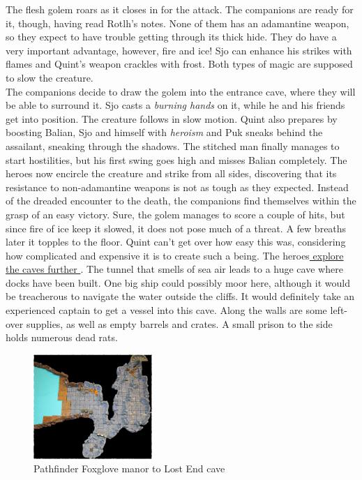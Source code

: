 The flesh golem roars as it closes in for the attack. The companions are ready for it, though, having read Rotlh's notes. None of them has an adamantine weapon, so they expect to have trouble getting through its thick hide. They do have a very important advantage, however, fire and ice! Sjo can enhance his strikes with flames and Quint's weapon crackles with frost. Both types of magic are supposed to slow the creature.\\

The companions decide to draw the golem into the entrance cave, where they will be able to surround it. Sjo casts a {\itshape burning hands} on it, while he and his friends get into position. The creature follows in slow motion. Quint also prepares by boosting Balian, Sjo and himself with  {\itshape heroism} and Puk sneaks behind the assailant, sneaking through the shadows. The stitched man finally manages to start hostilities, but his first swing goes high and misses Balian completely. The heroes now encircle the creature and strike from all sides, discovering that its resistance to non-adamantine weapons is not as tough as they expected. Instead of the dreaded encounter to the death, the companions find themselves within the grasp of an easy victory. Sure, the golem manages to score a couple of hits, but since fire of ice keep it slowed, it does not pose much of a threat. A few breaths later it topples to the floor. Quint can't get over how easy this was, considering how complicated and expensive it is to create such a being. The heroes\hyperref[fig:Pathfinder-Foxglove-manor-to-Lost-End-cave-515531738]{ explore the caves further } . The tunnel that smells of sea air leads to a huge cave where docks have been built. One big ship could possibly moor here, although it would be treacherous to navigate the water outside the cliffs. It would definitely take an experienced captain to get a vessel into this cave. Along the walls are some left-over supplies, as well as empty barrels and crates. A small prison to the side holds numerous dead rats. \\

\begin{figure}[h]
	\centering
	\includegraphics[width=0.4\textwidth]{images/Pathfinder-Foxglove-manor-to-Lost-End-cave-515531738_mod.jpg}
	\caption{Pathfinder Foxglove manor to Lost End cave}
	\label{fig:Pathfinder-Foxglove-manor-to-Lost-End-cave-515531738}
\end{figure}


